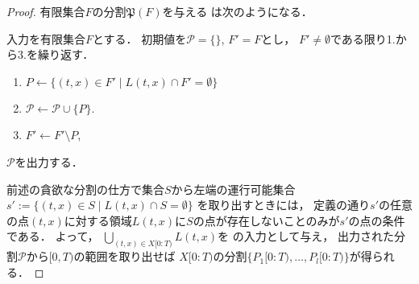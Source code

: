\begin{proof}
有限集合$F$の分割$\mathfrak{P}(F)$を与える
{\setPartitionAlgorithm}は次のようになる．

\begin{setPartitionAlgorithmForTimeSpecifiedProblemOnLine}
入力を有限集合$F$とする．
初期値を$\mathcal{P} = \{\}$, $F' = F$とし，
$F' \neq \emptyset$である限り1.から3.を繰り返す．
\begin{enumerate}
\item $P \gets \{ (t, x) \in F' \mid L(t, x) \cap F' = \emptyset \}$
\item $\mathcal{P} \gets \mathcal{P} \cup \{ P \}$.
\item $F' \gets F' \setminus P$, 
\end{enumerate}
$\mathcal{P}$を出力する．
\end{setPartitionAlgorithmForTimeSpecifiedProblemOnLine}

前述の貪欲な分割の仕方で集合$S$から左端の運行可能集合
$s' := \{ (t, x) \in S \mid L(t, x) \cap S = \emptyset \}$
を取り出すときには，
定義の通り$s'$の任意の点$(t, x)$に対する領域$L(t, x)$に$S$の点が存在しないことのみが$s'$の点の条件である．
よって，
$\bigcup_{(t, x) \in X[0:T)} L(t, x)$を
{\setPartitionAlgorithm}の入力として与え，
出力された分割$\mathcal{P}$から$[0, T)$の範囲を取り出せば
$X[0:T)$の分割$\{ P_1[0:T), \ldots, P_l[0:T) \}$が得られる．
\end{proof}
